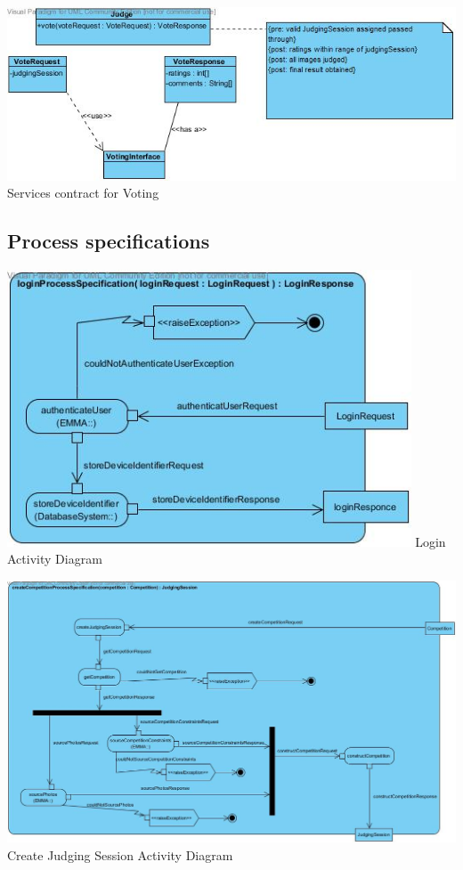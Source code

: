 \documentclass[10pt,a4paper]{article}
\begin{document}
\begin{center}
\advance\leftskip-1.3cm
\includegraphics[width=160mm]{Pictures/servicesContractVote.jpg} 
Services contract for Voting
\end{center}

\subsection{Process specifications}
\begin{center}
\includegraphics[width=120mm]{Pictures/LoginActivityDiagram.jpg} 
Login Activity Diagram 
\end{center}

\begin{center}
\advance\leftskip-2cm
\includegraphics[width=170mm]{Pictures/createJudgingSessionActivityDiagram.jpg} 
Create Judging Session Activity Diagram 
\end{center}
\end{document}
